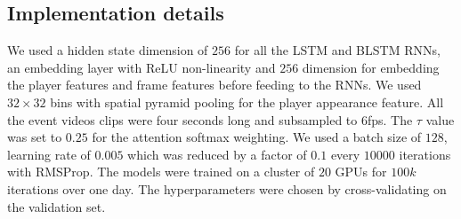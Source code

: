 \subsection{Implementation details}

 We used a hidden state dimension of $256$ for all the LSTM and
BLSTM RNNs, an embedding layer with ReLU non-linearity and $256$ dimension for
embedding the player features and frame features before feeding to the RNNs.
We used $32 \times 32$ bins with spatial pyramid pooling for the player appearance
feature.
All the event videos clips were four seconds long and subsampled to 6fps.  The
$\tau$ value was set to $0.25$ for the attention softmax weighting. We used a
batch size of $128$, learning rate of $0.005$ which was reduced by a factor of
$0.1$ every $10000$ iterations with RMSProp\cite{RMSProp}. The models were trained on
a cluster of $20$ GPUs for $100k$ iterations over one day.
The hyperparameters were chosen by cross-validating on the
validation set.
